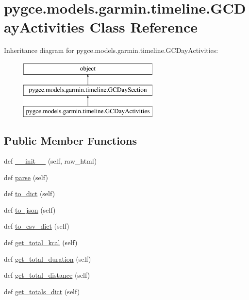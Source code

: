 \hypertarget{classpygce_1_1models_1_1garmin_1_1timeline_1_1_g_c_day_activities}{}\section{pygce.\+models.\+garmin.\+timeline.\+G\+C\+Day\+Activities Class Reference}
\label{classpygce_1_1models_1_1garmin_1_1timeline_1_1_g_c_day_activities}
Inheritance diagram for pygce.\+models.\+garmin.\+timeline.\+G\+C\+Day\+Activities\+:\begin{figure}[H]
\begin{center}
\leavevmode
\includegraphics[height=3.000000cm]{classpygce_1_1models_1_1garmin_1_1timeline_1_1_g_c_day_activities}
\end{center}
\end{figure}
\subsection*{Public Member Functions}
\begin{DoxyCompactItemize}
\item 
def \hyperlink{classpygce_1_1models_1_1garmin_1_1timeline_1_1_g_c_day_activities_abde52d1321a233947e2585e7ed43415b}{\+\_\+\+\_\+init\+\_\+\+\_\+} (self, raw\+\_\+html)
\item 
def \hyperlink{classpygce_1_1models_1_1garmin_1_1timeline_1_1_g_c_day_activities_a665d9bc773825c31562129f1f5b47a2c}{parse} (self)
\item 
def \hyperlink{classpygce_1_1models_1_1garmin_1_1timeline_1_1_g_c_day_activities_a6c4869fd929e6076d25e949c7ee51d91}{to\+\_\+dict} (self)
\item 
def \hyperlink{classpygce_1_1models_1_1garmin_1_1timeline_1_1_g_c_day_activities_ab1366ff6ee7b5230f12e6a3f324ffc8f}{to\+\_\+json} (self)
\item 
def \hyperlink{classpygce_1_1models_1_1garmin_1_1timeline_1_1_g_c_day_activities_a2e4d1b6ab08095a558271ba0299c3535}{to\+\_\+csv\+\_\+dict} (self)
\item 
def \hyperlink{classpygce_1_1models_1_1garmin_1_1timeline_1_1_g_c_day_activities_a1f271dd2ea272005fe5dc739496ed9e1}{get\+\_\+total\+\_\+kcal} (self)
\item 
def \hyperlink{classpygce_1_1models_1_1garmin_1_1timeline_1_1_g_c_day_activities_a960ae86a18db046fac6222a3f62e3035}{get\+\_\+total\+\_\+duration} (self)
\item 
def \hyperlink{classpygce_1_1models_1_1garmin_1_1timeline_1_1_g_c_day_activities_a2ad838af777ce178392b5f61ee6e6561}{get\+\_\+total\+\_\+distance} (self)
\item 
def \hyperlink{classpygce_1_1models_1_1garmin_1_1timeline_1_1_g_c_day_activities_a230c1feee2914f86f2bddb05fc2e51cd}{get\+\_\+totals\+\_\+dict} (self)
\end{DoxyCompactItemize}
